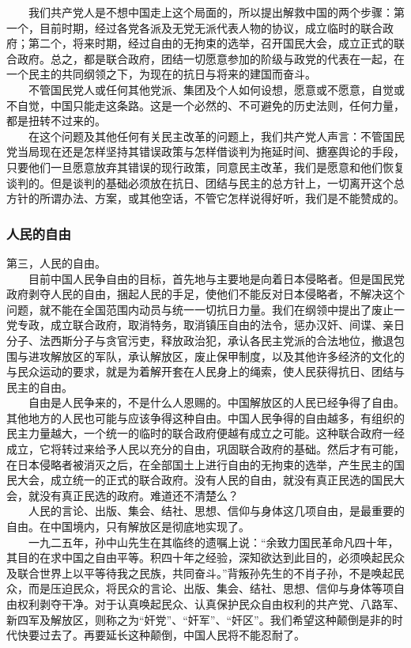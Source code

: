 \documentclass[cn,11pt,chinese]{elegantbook}
\def\myformat#1{\hfil\hfil #1}
\begin{document}
　　我们共产党人是不想中国走上这个局面的，所以提出解救中国的两个步骤：第一个，目前时期，经过各党各派及无党无派代表人物的协议，成立临时的联合政府；第二个，将来时期，经过自由的无拘束的选举，召开国民大会，成立正式的联合政府。总之，都是联合政府，团结一切愿意参加的阶级与政党的代表在一起，在一个民主的共同纲领之下，为现在的抗日与将来的建国而奋斗。\\
　　不管国民党人或任何其他党派、集团及个人如何设想，愿意或不愿意，自觉或不自觉，中国只能走这条路。这是一个必然的、不可避免的历史法则，任何力量，都是扭转不过来的。\\
　　在这个问题及其他任何有关民主改革的问题上，我们共产党人声言：不管国民党当局现在还是怎样坚持其错误政策与怎样借谈判为拖延时间、搪塞舆论的手段，只要他们一旦愿意放弃其错误的现行政策，同意民主改革，我们是愿意和他们恢复谈判的。但是谈判的基础必须放在抗日、团结与民主的总方针上，一切离开这个总方针的所谓办法、方案，或其他空话，不管它怎样说得好听，我们是不能赞成的。\\
\subsubsection*{\myformat{人民的自由}}
第三，人民的自由。\\
　　目前中国人民争自由的目标，首先地与主要地是向着日本侵略者。但是国民党政府剥夺人民的自由，捆起人民的手足，使他们不能反对日本侵略者，不解决这个问题，就不能在全国范围内动员与统一一切抗日力量。我们在纲领中提出了废止一党专政，成立联合政府，取消特务，取消镇压自由的法令，惩办汉奸、间谍、亲日分子、法西斯分子与贪官污吏，释放政治犯，承认各民主党派的合法地位，撤退包围与进攻解放区的军队，承认解放区，废止保甲制度，以及其他许多经济的文化的与民众运动的要求，就是为着解开套在人民身上的绳索，使人民获得抗日、团结与民主的自由。\\
　　自由是人民争来的，不是什么人恩赐的。中国解放区的人民已经争得了自由。其他地方的人民也可能与应该争得这种自由。中国人民争得的自由越多，有组织的民主力量越大，一个统一的临时的联合政府便越有成立之可能。这种联合政府一经成立，它将转过来给予人民以充分的自由，巩固联合政府的基础。然后才有可能，在日本侵略者被消灭之后，在全部国土上进行自由的无拘束的选举，产生民主的国民大会，成立统一的正式的联合政府。没有人民的自由，就没有真正民选的国民大会，就没有真正民选的政府。难道还不清楚么？\\
　　人民的言论、出版、集会、结社、思想、信仰与身体这几项自由，是最重要的自由。在中国境内，只有解放区是彻底地实现了。\\
　　一九二五年，孙中山先生在其临终的遗嘱上说：“余致力国民革命凡四十年，其目的在求中国之自由平等。积四十年之经验，深知欲达到此目的，必须唤起民众及联合世界上以平等待我之民族，共同奋斗。”背叛孙先生的不肖子孙，不是唤起民众，而是压迫民众，将民众的言论、出版、集会、结社、思想、信仰与身体等项自由权利剥夺干净。对于认真唤起民众、认真保护民众自由权利的共产党、八路军、新四军及解放区，则称之为“奸党”、“奸军”、“奸区”。我们希望这种颠倒是非的时代快要过去了。再要延长这种颠倒，中国人民将不能忍耐了。\\
\end{document}
